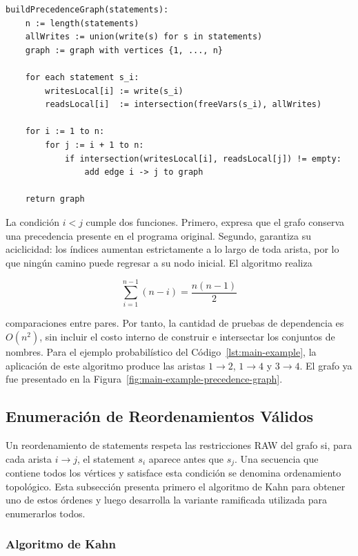 \begin{lstlisting}[style=haskell,caption={Pseudocódigo para construir el grafo de precedencia RAW.},label={lst:algoritmo-construccion-grafo}]
buildPrecedenceGraph(statements):
    n := length(statements)
    allWrites := union(write(s) for s in statements)
    graph := graph with vertices {1, ..., n}

    for each statement s_i:
        writesLocal[i] := write(s_i)
        readsLocal[i]  := intersection(freeVars(s_i), allWrites)

    for i := 1 to n:
        for j := i + 1 to n:
            if intersection(writesLocal[i], readsLocal[j]) != empty:
                add edge i -> j to graph

    return graph
\end{lstlisting}

La condición $i<j$ cumple dos funciones. Primero, expresa que el grafo conserva una precedencia presente en el programa original. Segundo, garantiza su aciclicidad: los índices aumentan estrictamente a lo largo de toda arista, por lo que ningún camino puede regresar a su nodo inicial. El algoritmo realiza

\[
\sum_{i=1}^{n-1}(n-i)=\frac{n(n-1)}{2}
\]

comparaciones entre pares. Por tanto, la cantidad de pruebas de dependencia es $O(n^2)$, sin incluir el costo interno de construir e intersectar los conjuntos de nombres. Para el ejemplo probabilístico del Código~\ref{lst:main-example}, la aplicación de este algoritmo produce las aristas $1\to2$, $1\to4$ y $3\to4$. El grafo ya fue presentado en la Figura~\ref{fig:main-example-precedence-graph}.

\subsection{Enumeración de Reordenamientos Válidos}
\label{sec:solucion-enumeracion}

Un reordenamiento de statements respeta las restricciones RAW del grafo si, para cada arista $i\to j$, el statement $s_i$ aparece antes que $s_j$. Una secuencia que contiene todos los vértices y satisface esta condición se denomina ordenamiento topológico. Esta subsección presenta primero el algoritmo de Kahn para obtener uno de estos órdenes y luego desarrolla la variante ramificada utilizada para enumerarlos todos.

\subsubsection{Algoritmo de Kahn}

